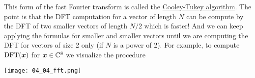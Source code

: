 \begin{note}
This form of the fast Fourier transform is called the \href{https://en.wikipedia.org/wiki/Cooley–Tukey_FFT_algorithm}{Cooley-Tukey algorithm}. The point is that the DFT computation for a vector of length $N$ can be compute by the DFT of two smaller vectors of length $N/2$ which is faster! And we can keep applying the formulas for smaller and smaller vectors until we are computing the DFT for vectors of size 2 only (if $N$ is a power of 2). For example, to compute $\mathrm{DFT}(\boldsymbol{x})$ for $\boldsymbol{x} \in \mathbb{C}^8$ we visualize the procedure

\begin{center}
\texttt{[image: 04\_04\_fft.png]}
\end{center}
\end{note}

